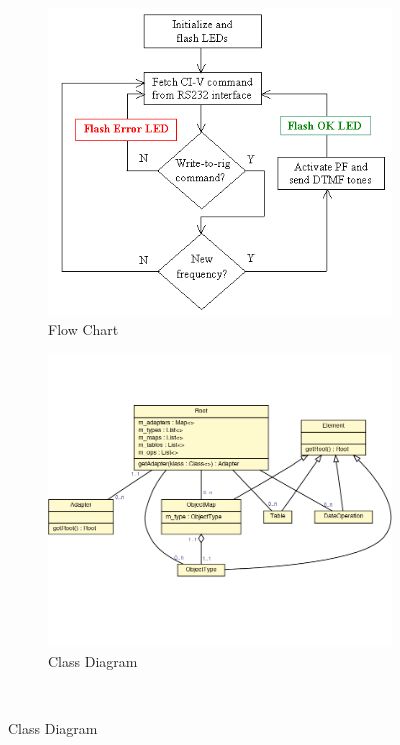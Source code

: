 \begin{figure}
\centering
\begin{subfigure}{.5\textwidth}
  \includegraphics[width=.95\linewidth]{../images/code-visualisations/flow-chart.png}
  \caption{Flow Chart}
  \label{fig:flow-chart}
\end{subfigure}%
\begin{subfigure}{.5\textwidth}
  \includegraphics[width=.95\linewidth]{../images/code-visualisations/class-diagram.png}
  \caption{Class Diagram}
  \label{fig:class-diagram}
\end{subfigure}\\

\end{figure}
